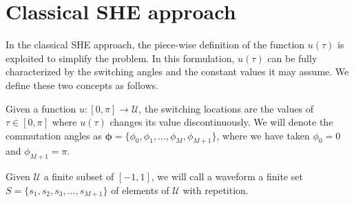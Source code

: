 \section{Classical SHE approach}\label{Section2}

In the classical SHE approach, the piece-wise definition of the function $u(\tau)$ is exploited to simplify the problem. In this formulation, $u(\tau)$ can be fully characterized by the switching angles and the constant values it may assume. We define these two concepts as follows.
\newline

\begin{definition}
Given a function $u:[0,\pi] \rightarrow \mathcal{U}$, the switching locations are the values of $\tau\in[0,\pi]$ where $u(\tau)$ changes its value discontinuously. We will denote the commutation angles as $\bm{\phi} = \{\phi_0,\phi_1,\dots,\phi_M,\phi_{M+1}\}$, where we have taken $\phi_0 = 0$ and $\phi_{M+1} = \pi$.
\end{definition}

\begin{definition}[Waveform]
Given $\mathcal U$ a finite subset of $[-1,1]$, we will call a waveform a finite set $S = \{s_1,s_2,s_3,\dots,s_{M+1}\}$ of elements of $\mathcal {U}$ with repetition.
\end{definition}

